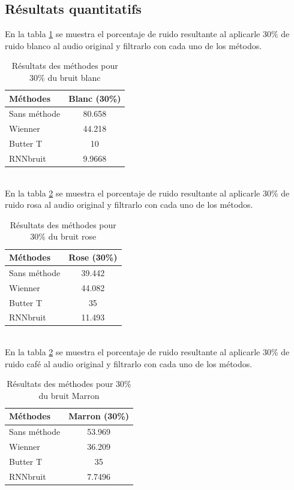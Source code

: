 \documentclass[conference,onecolumn]{IEEEtran}
\begin{document}
\subsection{Résultats quantitatifs}
En la tabla \ref{table:t1} se muestra el porcentaje de ruido
resultante al aplicarle 30\% de ruido blanco al audio original y
filtrarlo con cada uno de los métodos.  
\begin{table}[hbt!]
    \centering
    \begin{tabular}{ l  c }
    \textbf{Méthodes} & \textbf{Blanc (30\%)} \\
    \hline
    Sans méthode & 80.658 \\
    Wienner & 44.218 \\
    Butter T & 10 \\
    RNNbruit & 9.9668 \\
    \end{tabular}
    \caption{Résultats des méthodes pour 30\% du bruit blanc}
    \label{table:t1}
\end{table}
\hfill \\
En la tabla \ref{table:t2} se muestra el porcentaje de ruido resultante al aplicarle 30\% de ruido rosa al audio original y filtrarlo con cada uno de los métodos.  
\begin{table}[hbt!]
    \centering
    \begin{tabular}{ l  c }
    \textbf{Méthodes} & \textbf{Rose (30\%)} \\
    \hline
    Sans méthode & 39.442 \\
    Wienner & 44.082 \\
    Butter T & 35 \\
    RNNbruit & 11.493 \\
    \end{tabular}
    \caption{Résultats des méthodes pour 30\% du bruit rose}
    \label{table:t2}
\end{table}
\hfill \\
En la tabla \ref{table:t2} se muestra el porcentaje de ruido resultante al aplicarle 30\% de ruido café al audio original y filtrarlo con cada uno de los métodos. 
\begin{table}[hbt!]
    \centering
    \begin{tabular}{ l  c }
    \textbf{Méthodes} & \textbf{Marron (30\%)} \\
    \hline
    Sans méthode & 53.969 \\
    Wienner & 36.209 \\
    Butter T & 35 \\
    RNNbruit & 7.7496 \\
    \end{tabular}
    \caption{Résultats des méthodes pour 30\% du bruit Marron}
    \label{table:t3}
\end{table}
\end{document}
